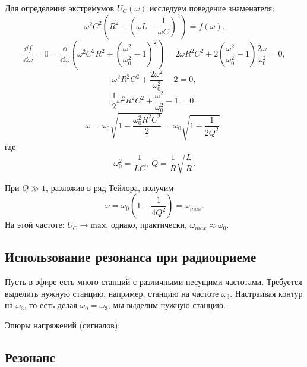         Для определения экстремумов \( U_C(\omega) \) исследуем поведение
        знаменателя:
        \[
            \omega^2C^2\left(R^2 + \left(\omega L - \frac{1}{\omega C}\right)^2
            \right) = f(\omega).
        \]
        \[
            \frac{\dd f}{\dd\omega} = 0 = \frac{\dd}{\dd\omega}
            \left(\omega^2C^2 R^2 + \left(\frac{\omega^2}{\omega_0^2} -
            1\right)^2\right) = 2\omega R^2C^2 + 
            2\left(\frac{\omega^2}{\omega_0^2} -
            1\right)\frac{2\omega}{\omega_0^2} = 0,
        \]
        \[
            \omega^2 R^2C^2 + \frac{2\omega^2}{\omega_0^2} - 2 = 0,
        \]
        \[
            \frac{1}{2}\omega^2R^2C^2 + \frac{\omega^2}{\omega_0^2} - 1 = 0,
        \]
        \[
            \omega = \omega_0\sqrt{1 - \frac{\omega_0^2R^2C^2}{2}} =
            \omega_0\sqrt{1 - \frac{1}{2Q^2}},
        \]
        где
        \[
            \omega_0^2 = \frac{1}{LC},\ Q = \frac{1}{R}\sqrt{\frac{L}{R}}.
        \]
        
        При \( Q \gg 1 \), разложив в ряд Тейлора, получим
        \[
            \omega = \omega_0\left(1 - \frac{1}{4Q^2}\right) = \omega_{{max}}.
        \]
        На этой частоте: \( U_C \to \mathrm{max} \), однако, практически,
        \( \omega_{{max}} \approx \omega_0 \).

    \subsection{Использование резонанса при радиоприеме}

        Пусть в эфире есть много станций с различными несущими частотами.
        Требуется выделить нужную станцию, например, станцию на частоте
        \( \omega_3 \). Настраивая контур на \( \omega_3 \), то есть делая
        \( \omega_0 = \omega_3 \), мы выделим нужную станцию.
        
        Эпюры напряжений (сигналов):

    \subsection{Резонанс}

